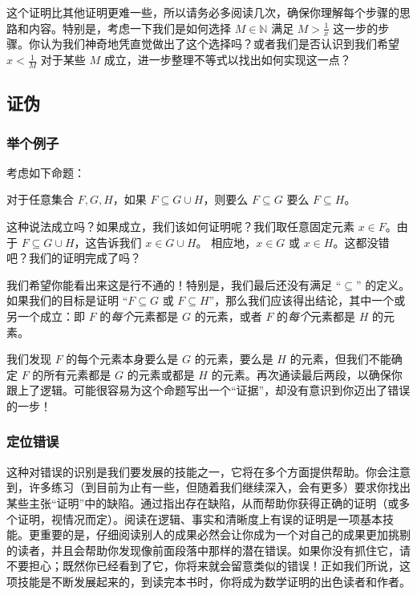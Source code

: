 这个证明比其他证明更难一些，所以请务必多阅读几次，确保你理解每个步骤的思路和内容。特别是，考虑一下我们是如何选择 $M \in \mathbb{N}$ 满足 $M > \frac{1}{x}$ 这一步的步骤。你认为我们神奇地凭直觉做出了这个选择吗？或者我们是否认识到我们希望 $x < \frac{1}{M}$ 对于某些 $M$ 成立，进一步整理不等式以找出如何实现这一点？

\subsection{证伪}

\subsubsection*{举个例子}

考虑如下命题：
\begin{center}
    对于任意集合 $F, G, H$，如果 $F \subseteq G \cup H$，则要么 $F \subseteq G$ 要么 $F \subseteq H$。
\end{center}

这种说法成立吗？如果成立，我们该如何证明呢？我们取任意固定元素 $x \in F$。由于 $F \subseteq G \cup H$，这告诉我们 $x \in G \cup H$。 相应地，$x \in G$ 或 $x \in H$。这都没错吧？我们的证明完成了吗？

我们希望你能看出来这是行不通的！特别是，我们最后还没有满足 ``$\subseteq$'' 的定义。如果我们的目标是证明 ``$F \subseteq G$ 或 $F \subseteq H$''，那么我们应该得出结论，其中一个或另一个成立：即 $F$ 的\emph{每个}元素都是 $G$ 的元素，或者 $F$ 的\emph{每个}元素都是 $H$ 的元素。

我们发现 $F$ 的每个元素本身要么是 $G$ 的元素，要么是 $H$ 的元素，但我们不能确定 $F$ 的所有元素都是 $G$ 的元素或都是 $H$ 的元素。再次通读最后两段，以确保你跟上了逻辑。可能很容易为这个命题写出一个``证据''，却没有意识到你迈出了错误的一步！

\subsubsection*{定位错误}

这种对错误的识别是我们要发展的技能之一，它将在多个方面提供帮助。你会注意到，许多练习（到目前为止有一些，但随着我们继续深入，会有更多）要求你找出某些主张``证明''中的缺陷。通过指出存在缺陷，从而帮助你获得正确的证明（或多个证明，视情况而定）。阅读在逻辑、事实和清晰度上有误的证明是一项基本技能。更重要的是，仔细阅读别人的成果必然会让你成为一个对自己的成果更加挑剔的读者，并且会帮助你发现像前面段落中那样的潜在错误。如果你没有抓住它，请不要担心；既然你已经看到了它，你将来就会留意类似的错误！正如我们所说，这项技能是不断发展起来的，到读完本书时，你将成为数学证明的出色读者和作者。

